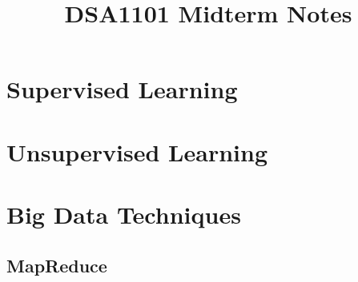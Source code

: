 \documentclass[fleqn, a4paper, 12pt]{article}\usepackage[]{graphicx}\usepackage[]{color}
\begin{document}
\title{DSA1101 Midterm Notes}
\date{}
\maketitle

\setcounter{tocdepth}{4}
\setcounter{secnumdepth}{4}
\tableofcontents





\section{Supervised Learning}





\section{Unsupervised Learning}

\section{Big Data Techniques}
\subsection{MapReduce}
\end{document}
